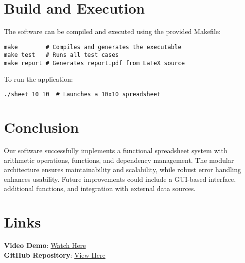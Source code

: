 \documentclass{article}
\begin{document}
\section{Build and Execution}
The software can be compiled and executed using the provided Makefile:
\begin{lstlisting}
make        # Compiles and generates the executable
make test   # Runs all test cases
make report # Generates report.pdf from LaTeX source
\end{lstlisting}

To run the application:
\begin{lstlisting}
./sheet 10 10  # Launches a 10x10 spreadsheet
\end{lstlisting}

\section{Conclusion}
Our software successfully implements a functional spreadsheet system with arithmetic operations, functions, and dependency management. The modular architecture ensures maintainability and scalability, while robust error handling enhances usability. Future improvements could include a GUI-based interface, additional functions, and integration with external data sources.

\section{Links}
\textbf{Video Demo}: \href{https://example.com/demo}{Watch Here}\\
\textbf{GitHub Repository}: \href{https://github.com/example/repo}{View Here}
\end{document}
